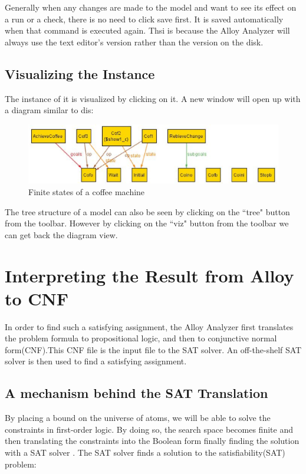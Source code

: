 \documentclass[a4paper,12pt]{report}
\begin{document}
\begin{onehalfspacing}
Generally when any changes are made to the model and want to see its effect on a run or a check, there is no need to click save first. It is saved automatically when that command is executed again. Thsi is because the Alloy Analyzer will always use the text editor's version rather than the version on the disk.

\section{Visualizing the Instance}
The instance of it is visualized by clicking on it. A new window will open up with a diagram similar to dis:

\begin{figure}[ht!]
\centering
\includegraphics[width=1.0\textwidth]{viz1}
\caption{Finite states of a coffee machine}
\end{figure}
 
The tree structure of a model can also be seen by clicking on the ``tree" button from the toolbar. However by clicking on the ``viz" button from the toolbar we can get back the diagram view.

\chapter{Interpreting the Result from Alloy to CNF} 
In order to find such a satisfying assignment, the Alloy Analyzer first translates the problem formula to propositional logic, and then to conjunctive normal form(CNF).This CNF file is the input file to the SAT solver. An off-the-shelf SAT solver is then used to find a satisfying assignment.

\section{A mechanism behind the SAT Translation}
\label{A view from behind}

By placing a bound on the universe of atoms, we will be able to solve the constraints in first-order logic. By doing so, the search space becomes finite and then translating the constraints into the Boolean form finally finding the solution with a SAT solver \cite{O.Strichman}. The SAT solver finds a solution to the satisfiability(SAT) problem: 


\end{onehalfspacing}
\end{document}

